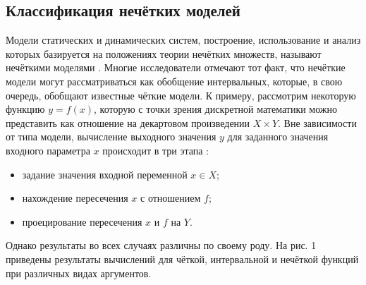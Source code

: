 \subsection{Классификация нечётких моделей}


Модели статических и динамических систем, построение, использование и анализ которых базируется на положениях теории нечётких множеств, называют нечёткими моделями \cite{Borisov_Fedulov}. Многие исследователи отмечают тот факт, что нечёткие модели могут рассматриваться как обобщение интервальных, которые, в свою очередь, обобщают известные чёткие модели. К примеру, рассмотрим некоторую функцию $y=f \left(x \right)$, которую с точки зрения дискретной математики можно представить как отношение на декартовом произведении $X \times Y$. Вне зависимости от типа модели, вычисление выходного значения $y$ для заданного значения входного параметра $x$ происходит в три этапа \cite{Borisov_Fedulov}:
\begin{itemize}
	\item задание значения входной переменной $x \in X$;
	\item нахождение пересечения $x$ с отношением $f$;
	\item проецирование пересечения $x$ и $f$ на $Y$.
\end{itemize}

Однако результаты во всех случаях различны по своему роду. На рис. 1 приведены результаты вычислений для чёткой, интервальной и нечёткой функций при различных видах аргументов. 

